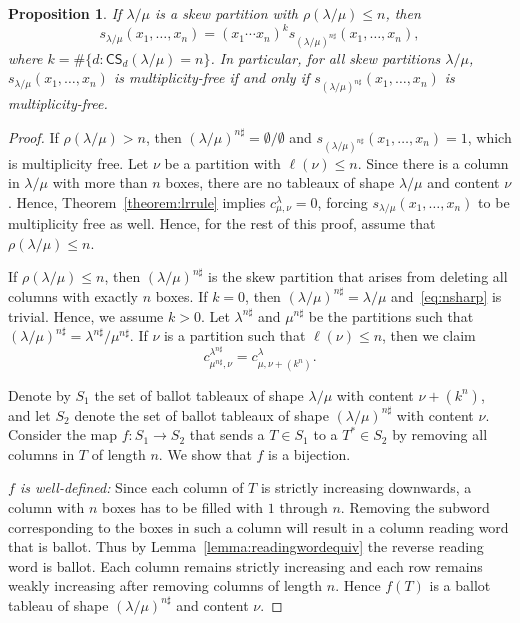 \documentclass[10pt]{article}
\newtheorem{prop}[theorem]{Proposition}
\theoremstyle{definition}
\newcommand{\CS	}{\mathsf{CS}}
\newcommand{\nsharp}{n\sharp}%
\begin{document}
\begin{prop}
\label{prop:reductionnsharp}
If $\lambda / \mu$ is a skew partition with $\rho(\lambda/\mu)\leq n$, then 
\begin{equation}
\label{eq:nsharp}
s_{\lambda / \mu}(x_1,\ldots,x_n) = (x_1 \cdots x_n)^k s_{(\lambda / \mu)^{\nsharp}}(x_1,\ldots,x_n),
\end{equation}
where $k = \# \{ d : \CS _d(\lambda / \mu) = n \}$. In particular, for all skew partitions $\lambda/\mu$, $s_{\lambda / \mu}(x_1,\ldots,x_n)$ is multiplicity-free if and only if $s_{(\lambda / \mu)^{\nsharp }}(x_1,\ldots,x_n)$ is multiplicity-free.
\end{prop}
\begin{proof}
If $\rho(\lambda / \mu) > n$, then $(\lambda / \mu)^{\nsharp } = \emptyset / \emptyset$ and $s_{(\lambda / \mu)^{\nsharp }}(x_1,\ldots,x_n) = 1$, which is multiplicity free. Let $\nu$ be a partition with $\ell(\nu) \leq n$. Since there is a column in $\lambda / \mu$ with more than $n$ boxes, there are no tableaux of shape $\lambda / \mu$ and content $\nu$. Hence, Theorem~\ref{theorem:lrrule} implies $c_{\mu, \nu}^{\lambda} = 0$, forcing $s_{\lambda / \mu}(x_1,\ldots,x_n)$ to be multiplicity free as well. Hence, for the rest of this proof, assume that $\rho(\lambda/\mu)\leq n$.

If $\rho(\lambda / \mu) \leq n$, then $(\lambda / \mu)^{\nsharp }$ is the skew partition that arises from deleting all columns with exactly $n$ boxes. If $k = 0$, then $(\lambda / \mu)^{\nsharp }=\lambda / \mu$ and~\eqref{eq:nsharp} is trivial. Hence, we assume $k > 0$. Let $\lambda^{n\sharp}$ and $\mu^{n\sharp}$ be the partitions such that $(\lambda / \mu)^{\nsharp } = \lambda^{n\sharp} / \mu^{n\sharp}$. If $\nu$ is a partition such that $\ell(\nu) \leq n$, then we claim
\begin{equation}
\label{eq:nsharpLR}
c_{\mu^{n\sharp}, \nu}^{\lambda^{n\sharp}} = c_{\mu, \nu + (k^n)}^{\lambda}.
\end{equation}

Denote by $S_1$ the set of ballot tableaux of shape $\lambda/\mu$ with content $\nu + (k^n)$, and let $S_2$ denote the set of ballot tableaux of shape $(\lambda / \mu)^{\nsharp }$ with content $\nu$. Consider the map $f:S_1\xrightarrow{}S_2$ that sends a $T \in S_1$ to a $T^* \in S_2$ by removing all columns in $T$ of length $n$. We show that $f$ is a bijection.

\emph{$f$ is well-defined:} Since each column of $T$ is strictly increasing downwards, a column with $n$ boxes has to be filled with $1$ through $n$. Removing the subword corresponding to the boxes in such a column will result in a column reading word that is ballot. Thus by Lemma~\ref{lemma:readingwordequiv} the reverse reading word is ballot. Each column remains strictly increasing and each row remains weakly increasing after removing columns of length $n$. Hence $f(T)$ is a ballot tableau of shape $(\lambda / \mu)^{\nsharp }$ and content $\nu$.


\end{proof}
\end{document}
